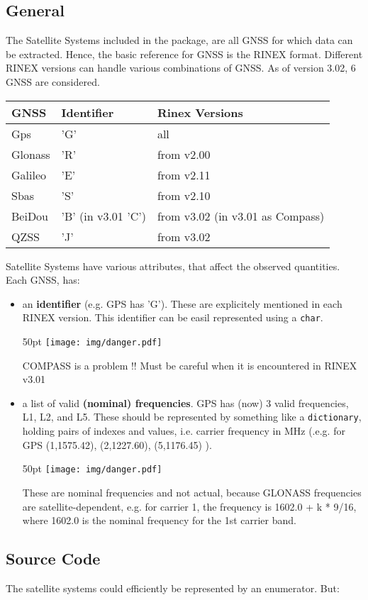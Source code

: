 \documentclass{article}
\newcommand{\alertwarningbox}[1]{
    \centering
    \colorbox{warningbackground}{\parbox{400pt} {
            \vskip 10pt
            \begin{floatingfigure}[l]{50pt}
                \texttt{[image: img/danger.pdf]}
            \end{floatingfigure}
            #1
            \vskip 10pt
        }
    }
}
\begin{document}
\subsection{General}
The Satellite Systems included in the package, are all GNSS for which data can be extracted. Hence, 
the basic reference for GNSS is the RINEX format. Different RINEX versions can handle various
combinations of GNSS. As of version 3.02, 6 GNSS are considered.
\begin{center}
\begin{tabular}{l l l}
\hline
GNSS     & Identifier &  Rinex Versions\\
\hline
Gps      & 'G'                &  all\\
Glonass  & 'R'                &  from v2.00\\
Galileo  & 'E'                &  from v2.11\\
Sbas     & 'S'                &  from v2.10\\
BeiDou   & 'B' (in v3.01 'C') &  from v3.02 (in v3.01 as Compass)\\
QZSS     & 'J'                &  from v3.02\\
\end{tabular}
\end{center}
Satellite Systems have various attributes, that affect the observed quantities. Each GNSS,
has:
\begin{itemize}

\item an \textbf{identifier} (e.g. GPS has 'G'). These are explicitely mentioned in each RINEX version.
This identifier can be easil represented using a \texttt{char}.

\alertwarningbox{COMPASS is a problem !! Must be careful when it is encountered in RINEX v3.01}

\item a list of valid \textbf{(nominal) frequencies}. GPS has (now) 3 valid frequencies, L1, L2,
and L5. These should be represented by something like a \texttt{dictionary}, holding pairs of
indexes and values, i.e. carrier frequency in MHz (.e.g. for GPS { (1,1575.42), (2,1227.60), (5,1176.45) }).

\alertwarningbox{These are nominal frequencies and not actual, because GLONASS frequencies
are satellite-dependent, e.g. for carrier 1, the frequency is 1602.0 + k * 9/16,
where 1602.0 is the nominal frequency for the 1st carrier band.}
\end{itemize}

\subsection{Source Code}
The satellite systems could efficiently be represented by an enumerator. But:
\end{document}
